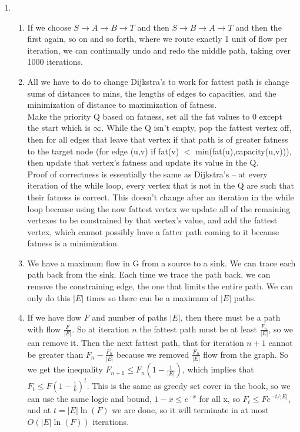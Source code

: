 \documentclass[11pt]{article}
\begin{document}
\begin{enumerate}
\newpage
\item 
\begin{enumerate}
\item If we choose $S\to A\to B\to T$ and then $S\to B\to A\to T$ and then the first again, so on and so forth, where we route exactly 1 unit of flow per iteration, we can continually undo and redo the middle path, taking over 1000 iterations.
\item All we have to do to change Dijkstra's to work for fattest path is change sums of distances to mins, the lengths of edges to capacities, and the minimization of distance to maximization of fatness.\\
Make the priority Q based on fatness, set all the fat values to $0$ except the start which is $\infty$. While the Q isn't empty, pop the fattest vertex off, then for all edges that leave that vertex if that path is of greater fatness to the target node (for edge (u,v) if fat(v) $<$ min(fat(u),capacity(u,v))), then update that vertex's fatness and update its value in the Q.\\
Proof of correctness is essentially the same as Dijkstra's -- at every iteration of the while loop, every vertex that is not in the Q are such that their fatness is correct. This doesn't change after an iteration in the while loop because using the now fattest vertex we update all of the remaining vertexes to be constrained by that vertex's value, and add the fattest vertex, which cannot possibly have a fatter path coming to it because fatness is a minimization.
\item We have a maximum flow in G from a source to a sink. We can trace each path back from the sink. Each time we trace the path back, we can remove the constraining edge, the one that limits the entire path. We can only do this $|E|$ times so there can be a maximum of $|E|$ paths.
\item If we have flow $F$ and number of paths $|E|$, then there must be a path with flow $\frac{F}{|E|}$. So at iteration $n$ the fattest path must be at least $\frac{F_n}{|E|}$, so we can remove it. Then the next fattest path, that for iteration $n+1$ cannot be greater than $F_n-\frac{F_n}{|E|}$ because we removed $\frac{F_n}{|E|}$ flow from the graph. So we get the inequality $F_{n+1}\le F_n(1-\frac{1}{|E|})$, which implies that $F_t\le F(1-\frac{1}{k})^t$. This is the same as greedy set cover in the book, so we can use the same logic and bound, $1-x\le e^{-x}$ for all x, so $F_t \le Fe^{-t/|E|}$, and at $t=|E|\ln(F)$ we are done, so it will terminate in at most $O(|E|\ln(F))$ iterations.

\end{enumerate}
\end{enumerate}
\end{document}
